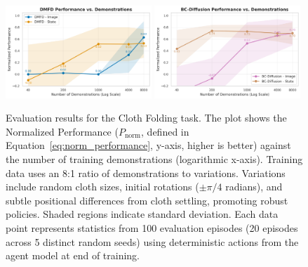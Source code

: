 \documentclass{article} %
\begin{document}
\begin{figure}[htbp] %
    \centering
    \includegraphics[width=0.49\textwidth]{img/cloth_fold/dmfd_performance_vs_num_dems.png}
    \hfill
    \includegraphics[width=0.49\textwidth]{img/cloth_fold/bc_diffusion_performance_vs_num_dems.png}
    \caption{
        Evaluation results for the Cloth Folding task. The plot shows the Normalized Performance (\(P_{\text{norm}}\), defined in Equation~\eqref{eq:norm_performance}, y-axis, higher is better) against the number of training demonstrations (logarithmic x-axis). Training data uses an 8:1 ratio of demonstrations to variations. Variations include random cloth sizes, initial rotations (\(\pm\pi/4\) radians), and subtle positional differences from cloth settling, promoting robust policies. Shaded regions indicate standard deviation. Each data point represents statistics from 100 evaluation episodes (20 episodes across 5 distinct random seeds) using deterministic actions from the agent model at end of training.
    }
    \label{fig:performance_vs_dems} %
\end{figure}
\end{document}
